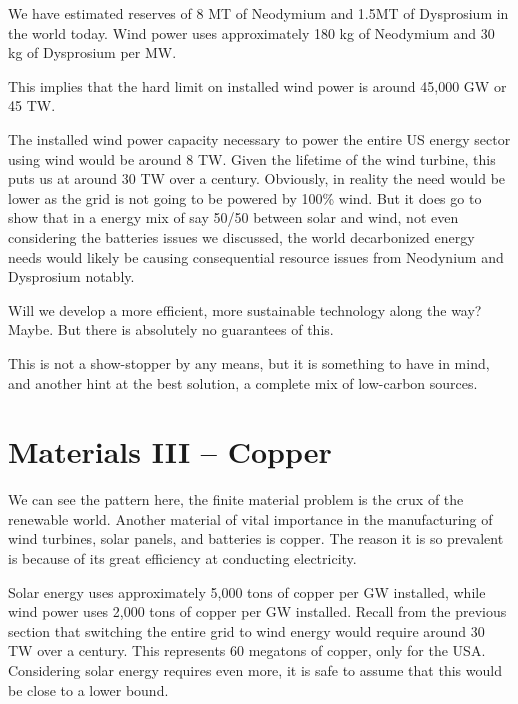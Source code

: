 We have estimated reserves of 8 MT of Neodymium and 1.5MT of Dysprosium in the world today. Wind power uses approximately 180 kg of Neodymium and 30 kg of Dysprosium per MW.

This implies that the hard limit on installed wind power is around 45,000 GW or 45 TW.

The installed wind power capacity necessary to power the entire US energy sector using wind would be around 8 TW. Given the lifetime of the wind turbine, this puts us at around 30 TW over a century. Obviously, in reality the need would be lower as the grid is not going to be powered by 100\% wind. But it does go to show that in a energy mix of say 50/50 between solar and wind, not even considering the batteries issues we discussed, the world decarbonized energy needs would likely be causing consequential resource issues from Neodynium and Dysprosium notably.

Will we develop a more efficient, more sustainable technology along the way? Maybe. But there is absolutely no guarantees of this.

This is not a show-stopper by any means, but it is something to have in mind, and another hint at the best solution, a complete mix of low-carbon sources.

\section{Materials III -- Copper}

We can see the pattern here, the finite material problem is the crux of the renewable world. Another material of vital importance in the manufacturing of wind turbines, solar panels, and batteries is copper. The reason it is so prevalent is because of its great efficiency at conducting electricity.

Solar energy uses approximately 5,000 tons of copper per GW installed, while wind power uses 2,000 tons of copper per GW installed. Recall from the previous section that switching the entire grid to wind energy would require around 30 TW over a century. This represents 60 megatons of copper, only for the USA. Considering solar energy requires even more, it is safe to assume that this would be close to a lower bound.

